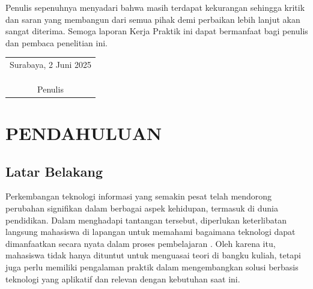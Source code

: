 \documentclass{file/KP-ITS}
\theoremstyle{definition}
\theoremstyle{definition}
\theoremstyle{plain}
\begin{document}
\indent Penulis sepenuhnya menyadari bahwa masih terdapat kekurangan sehingga kritik dan saran yang membangun dari semua pihak demi perbaikan lebih lanjut akan sangat diterima. Semoga laporan Kerja Praktik ini dapat bermanfaat bagi penulis dan pembaca penelitian ini.

\begin{flushright}
  \begin{tabular}[b]{c}
    Surabaya, 2 Juni 2025
    \\
    \\
    \\
    \\
    Penulis
  \end{tabular}
\end{flushright}


\DaftarIsi

\DaftarGambar






\BagianInti

\chapter{PENDAHULUAN}
\section{Latar Belakang}
Perkembangan teknologi informasi yang semakin pesat telah mendorong perubahan signifikan dalam berbagai aspek kehidupan, termasuk di dunia pendidikan. Dalam menghadapi tantangan tersebut, diperlukan keterlibatan langsung mahasiswa di lapangan untuk memahami bagaimana teknologi dapat dimanfaatkan secara nyata dalam proses pembelajaran \cite{suryadi2019}. Oleh karena itu, mahasiswa tidak hanya dituntut untuk menguasai teori di bangku kuliah, tetapi juga perlu memiliki pengalaman praktik dalam mengembangkan solusi berbasis teknologi yang aplikatif dan relevan dengan kebutuhan saat ini.
\end{document}
